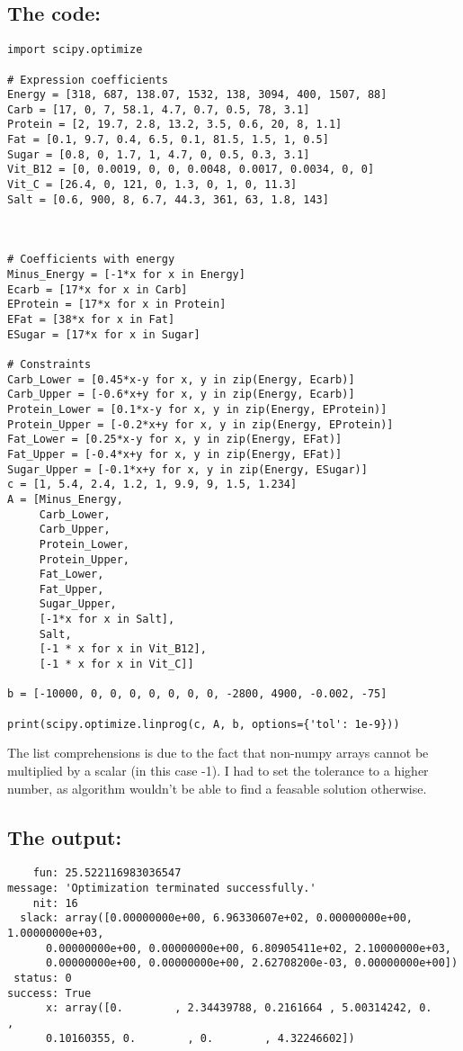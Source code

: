 \documentclass[margin=0.3in]{article}
\begin{document}
\subsection{The code:}
\label{sec-3-1}
\lstset{language=Python,label=simplex,caption= ,numbers=none}
\begin{lstlisting}
import scipy.optimize

# Expression coefficients
Energy = [318, 687, 138.07, 1532, 138, 3094, 400, 1507, 88]
Carb = [17, 0, 7, 58.1, 4.7, 0.7, 0.5, 78, 3.1]
Protein = [2, 19.7, 2.8, 13.2, 3.5, 0.6, 20, 8, 1.1]
Fat = [0.1, 9.7, 0.4, 6.5, 0.1, 81.5, 1.5, 1, 0.5]
Sugar = [0.8, 0, 1.7, 1, 4.7, 0, 0.5, 0.3, 3.1]
Vit_B12 = [0, 0.0019, 0, 0, 0.0048, 0.0017, 0.0034, 0, 0]
Vit_C = [26.4, 0, 121, 0, 1.3, 0, 1, 0, 11.3]
Salt = [0.6, 900, 8, 6.7, 44.3, 361, 63, 1.8, 143]



# Coefficients with energy
Minus_Energy = [-1*x for x in Energy]
Ecarb = [17*x for x in Carb]
EProtein = [17*x for x in Protein]
EFat = [38*x for x in Fat]
ESugar = [17*x for x in Sugar]

# Constraints
Carb_Lower = [0.45*x-y for x, y in zip(Energy, Ecarb)]
Carb_Upper = [-0.6*x+y for x, y in zip(Energy, Ecarb)]
Protein_Lower = [0.1*x-y for x, y in zip(Energy, EProtein)]
Protein_Upper = [-0.2*x+y for x, y in zip(Energy, EProtein)]
Fat_Lower = [0.25*x-y for x, y in zip(Energy, EFat)]
Fat_Upper = [-0.4*x+y for x, y in zip(Energy, EFat)]
Sugar_Upper = [-0.1*x+y for x, y in zip(Energy, ESugar)]
c = [1, 5.4, 2.4, 1.2, 1, 9.9, 9, 1.5, 1.234]
A = [Minus_Energy,
     Carb_Lower,
     Carb_Upper,
     Protein_Lower,
     Protein_Upper,
     Fat_Lower,
     Fat_Upper,
     Sugar_Upper,
     [-1*x for x in Salt],
     Salt,
     [-1 * x for x in Vit_B12],
     [-1 * x for x in Vit_C]]

b = [-10000, 0, 0, 0, 0, 0, 0, 0, -2800, 4900, -0.002, -75]

print(scipy.optimize.linprog(c, A, b, options={'tol': 1e-9}))
\end{lstlisting}
The list comprehensions is due to the fact that non-numpy arrays cannot be multiplied by a scalar (in this case -1). I had to set the tolerance to a higher number, as algorithm wouldn't be able to find a feasable solution otherwise.

\subsection{The output:}
\label{sec-3-2}
\begin{verbatim}
    fun: 25.522116983036547
message: 'Optimization terminated successfully.'
    nit: 16
  slack: array([0.00000000e+00, 6.96330607e+02, 0.00000000e+00, 1.00000000e+03,
      0.00000000e+00, 0.00000000e+00, 6.80905411e+02, 2.10000000e+03,
      0.00000000e+00, 0.00000000e+00, 2.62708200e-03, 0.00000000e+00])
 status: 0
success: True
      x: array([0.        , 2.34439788, 0.2161664 , 5.00314242, 0.        ,
      0.10160355, 0.        , 0.        , 4.32246602])
\end{verbatim}
\end{document}
